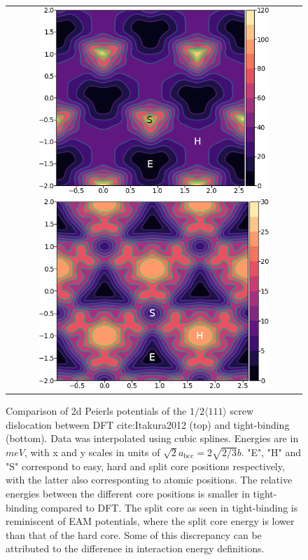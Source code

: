 \documentclass[a4paper,11pt]{article}
\begin{document}
        \begin{figure}
    \begin{tabular}{c}
	     \includegraphics[width=0.8\textwidth]{../Images/itakura_dislocation_energy_landscape_2_labelled.png} \\
             \includegraphics[width=0.8\textwidth]{../Images/tbe_dislocation_energy_landscape_pure_labelled.png}  \\
    \end{tabular}		
\caption{Comparison of 2d Peierls potentials of the $1/2\langle 111\rangle$ screw dislocation between DFT cite:Itakura2012 (top) and tight-binding (bottom). Data was interpolated using cubic splines. Energies are in $meV$, with x and y scales in units of $\sqrt{2} a_{\text{bcc}} = 2\sqrt{2/3}b$. "E", "H" and "S" correspond to easy, hard and split core positions respectively, with the latter also corresponting to atomic positions. The relative energies between the different core positions is smaller in tight-binding compared to DFT. The split core as seen in tight-binding is reminiscent of EAM potentials, where the split core energy is lower than that of the hard core. Some of this discrepancy can be attributed to the difference in interaction energy definitions.}
	\label{fig:peierlspot}
    \end{figure}
\end{document}
